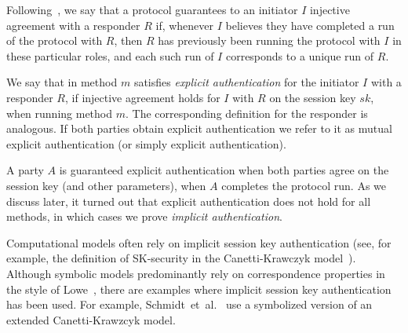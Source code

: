  
\label{sec:authenticationDef}
Following~\cite{DBLP:conf/csfw/Lowe97a}, we say that a protocol guarantees to an
initiator $I$ injective agreement with a responder $R$ if, whenever $I$ believes
they have completed a run of the protocol with $R$, then $R$ has previously been
running the protocol with $I$ in these particular roles, and each such run of
$I$ corresponds to a unique run of $R$.

%
We say that \mEdhoc{} in method $m$ satisfies \emph{explicit authentication} for
the initiator $I$ with a responder $R$, if injective agreement holds for $I$
with $R$ on the session key $sk$, when running method $m$.
%
The corresponding definition for the responder is analogous.
%
If both parties obtain explicit authentication we refer to it as mutual explicit
authentication (or simply explicit authentication).

A party $A$ is guaranteed explicit authentication when both parties agree
on the session key (and other parameters), when $A$ completes the protocol
run.
%
As we discuss later, it turned out that explicit authentication does not hold for all
\mEdhoc{} methods, in which cases we prove \emph{implicit authentication}.

Computational models often rely on implicit session key authentication
(see, for example, the definition of SK-security in the Canetti-Krawczyk
model~\cite{DBLP:conf/crypto/CanettiK02}).
%
Although symbolic models predominantly rely on correspondence properties
in the style of Lowe~\cite{DBLP:conf/csfw/Lowe97a}, there are examples where
implicit session key authentication has been used.
%
For example, Schmidt~et~al.~\cite{DBLP:conf/csfw/SchmidtMCB12} use a
symbolized version of an extended Canetti-Krawzcyk model.

